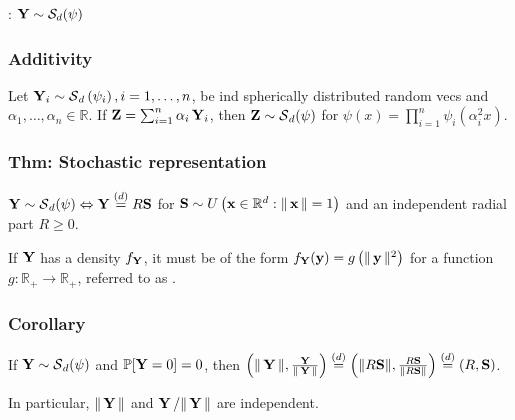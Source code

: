 : $\Y \sim \mathcal{S}_{d}(\psi)$

\subsubsection*{Additivity}
Let $\Y_{i} \sim \S_{d}\left(\psi_{i}\right), i=1, \ldots, n$, be ind spherically distributed random vecs and $\alpha_{1}, \ldots, \alpha_{n} \in \mathbb{R}$. If $\Z=\sum_{i=1}^{n} \alpha_{i} \Y_{i}$, then $\Z \sim \S_{d}(\psi)$ for $\psi(x)=\prod_{i=1}^{n} \psi_{i}\left(\alpha_{i}^{2} x\right)$.



\subsubsection*{Thm: Stochastic representation}
$\Y \sim \S_{d}(\psi) \Leftrightarrow \Y \stackrel{(d)}{=} R \vect{S}$ for $\vect{S} \sim U\left(\x \in \mathbb{R}^{d}:\|\x\|=1\right)$ and an independent radial part $R \geq 0$.

If $\Y$ has a density $f_{\Y}$, it must be of the form $f_{\Y}(\y)=g\left(\|\y\|^{2}\right)$ for a function $g: \mathbb{R}_{+} \rightarrow \mathbb{R}_{+}$,  referred to as .



\subsubsection*{Corollary}
If $\Y \sim \S_{d}(\psi)$ and $\mathbb{P}[\Y=0]=0$, then
$
\left(\|\Y\|, \frac{\Y}{\|\Y\|}\right) \stackrel{(d)}{=}\left(\|R \vect{S}\|, \frac{R \vect{S}}{\|R \vect{S}\|}\right) \stackrel{(d)}{=}(R, \vect{S})
$. 

In particular, $\|\Y\|$ and $\Y /\|\Y\|$ are independent.





